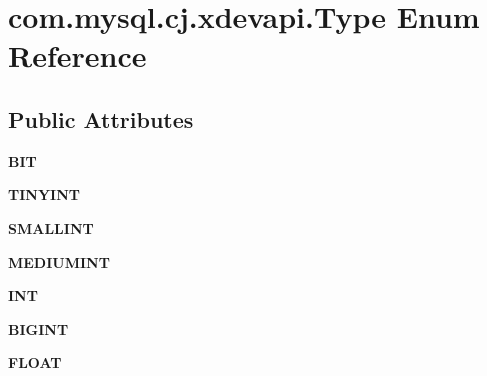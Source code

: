 \hypertarget{enumcom_1_1mysql_1_1cj_1_1xdevapi_1_1_type}{}\section{com.\+mysql.\+cj.\+xdevapi.\+Type Enum Reference}
\label{enumcom_1_1mysql_1_1cj_1_1xdevapi_1_1_type}
\subsection*{Public Attributes}
\begin{DoxyCompactItemize}
\item 
\mbox{\label{enumcom_1_1mysql_1_1cj_1_1xdevapi_1_1_type_a8f14a97660638252f65e42167d357250}} 
{\bfseries B\+IT}
\item 
\mbox{\label{enumcom_1_1mysql_1_1cj_1_1xdevapi_1_1_type_abb7980c75b380fb05b922cb692e1716d}} 
{\bfseries T\+I\+N\+Y\+I\+NT}
\item 
\mbox{\label{enumcom_1_1mysql_1_1cj_1_1xdevapi_1_1_type_aa3075184cee0b8cdb200b773bce4ff77}} 
{\bfseries S\+M\+A\+L\+L\+I\+NT}
\item 
\mbox{\label{enumcom_1_1mysql_1_1cj_1_1xdevapi_1_1_type_a23e999ebe44e82e6ba5c38d9c9991f8c}} 
{\bfseries M\+E\+D\+I\+U\+M\+I\+NT}
\item 
\mbox{\label{enumcom_1_1mysql_1_1cj_1_1xdevapi_1_1_type_a4df36f1739a4a43fba1f06dbde494390}} 
{\bfseries I\+NT}
\item 
\mbox{\label{enumcom_1_1mysql_1_1cj_1_1xdevapi_1_1_type_a2d52786ebe465aa72338f620f0010f61}} 
{\bfseries B\+I\+G\+I\+NT}
\item 
\mbox{\label{enumcom_1_1mysql_1_1cj_1_1xdevapi_1_1_type_a74c8f06cf55f7b0017d3ea65de135e02}} 
{\bfseries F\+L\+O\+AT}
\item 
\mbox{\label{enumcom_1_1mysql_1_1cj_1_1xdevapi_1_1_type_af635e2741a3c8e3eab7cfeb06e64669e}} 

\end{DoxyCompactItemize}
